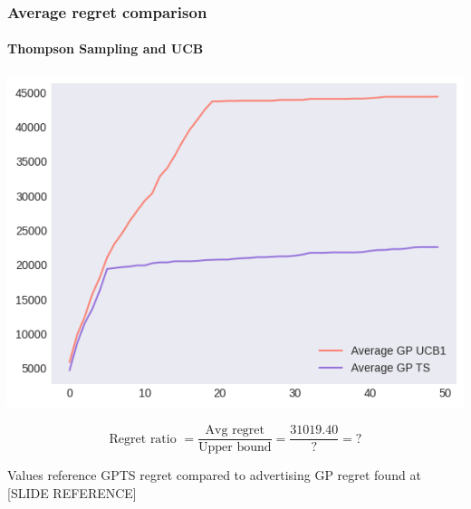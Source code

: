 
\begin{frame}[plain]

\frametitle{Average regret comparison}
\framesubtitle{Thompson Sampling and UCB}

\begin{center}
	\includegraphics[scale=0.45]{img/Graphs/uncertain_alpha/image6.png}
\end{center}

\begin{displaymath}
	\text{Regret ratio } = \frac{\text{Avg regret}}{\text{Upper bound}} = \frac{31019.40}{?} = ?
\end{displaymath}

\scriptsize Values reference GPTS regret compared to advertising GP regret found at [SLIDE REFERENCE]


\end{frame}



